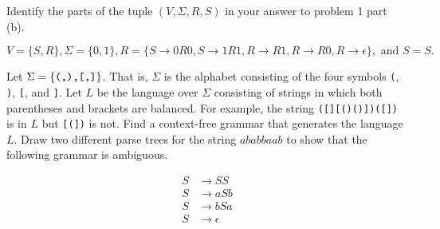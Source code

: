 \documentclass[12pt]{exam}
\begin{document}
\begin{questions}

\question Identify the parts of the tuple $(V, \Sigma, R, S)$ in your answer to problem 1 part (b).  
\begin{solution}
$$V = \{S,R\}, \Sigma = \{0,1\}, R = \{S \rightarrow 0R0, S \rightarrow 1R1, R \rightarrow R1, R \rightarrow R0, R \rightarrow \epsilon \}, \text{ and } S = S.$$
\end{solution}
\vfill

\newpage
\question Let $\Sigma = \{ \verb|(,),[,]| \}$. That is, $\Sigma$ is the alphabet consisting of the four symbols \verb|(|, \verb|)|, \verb|[|, and \verb|]|. Let $L$ be the language over $\Sigma$ consisting of strings in which both parentheses and brackets are balanced. For example, the string \verb|([][()()])([])| is in $L$ but \verb|[(])| is not. Find a context-free grammar that generates the language $L$.
\vfill
\question Draw two different parse trees for the string $ababbaab$ to show that the following grammar is ambiguous.

\begin{minipage}{1.5in}
\begin{align*}
S &\rightarrow SS \\
S &\rightarrow aSb \\
S &\rightarrow bSa \\
S &\rightarrow \epsilon 
\end{align*}
\end{minipage}
\vfill


\end{questions}
\end{document}
